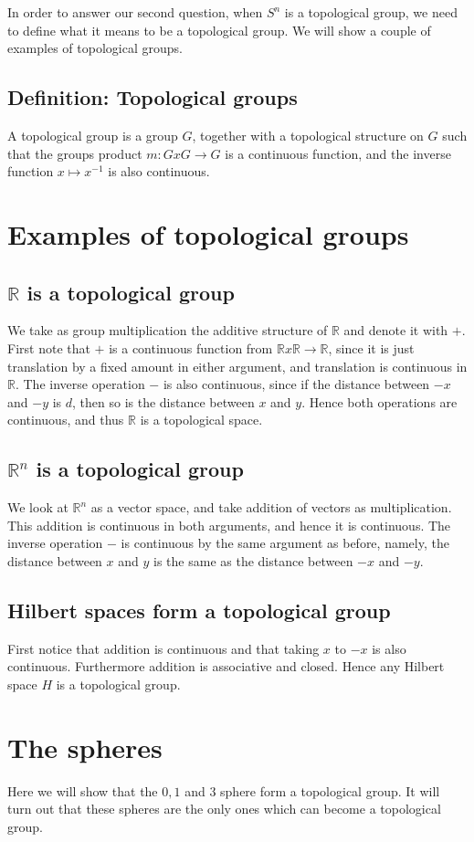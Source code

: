 \documentclass[../Thesis.tex]{subfiles}
\begin{document}
In order to answer our second question, when $S^{n}$ is a topological group, we need to define what it means to be a topological group. We will show a couple of examples of topological groups.
\subsection*{Definition: Topological groups}
A topological group is a group $G$, together with a topological structure on $G$ such that the groups product $m: G x G \rightarrow G$ is a continuous function, and the inverse function $x \mapsto x^{-1}$ is also continuous.
\section{Examples of topological groups}
\subsection{$\mathbb{R}$ is a topological group}
We take as group multiplication the additive structure of $\mathbb{R}$ and denote it with $+$. First note that $+$ is a continuous function from $\mathbb{R} x \mathbb{R} \rightarrow \mathbb{R}$, since it is just translation by a fixed amount in either argument, and translation is continuous in $\mathbb{R}$. The inverse operation $-$ is also continuous, since if the distance between $-x$ and $-y$ is $d$, then so is the distance between $x$ and $y$. Hence both operations are continuous, and thus $\mathbb{R}$ is a topological space.
\subsection{$\mathbb{R}^n$ is a topological group}
We look at $\mathbb{R}^n$ as a vector space, and take addition of vectors as multiplication. This addition is continuous in both arguments, and hence it is continuous. The inverse operation $-$ is continuous by the same argument as before, namely, the distance between $x$ and $y$ is the same as the distance between $-x$ and $-y$.
\subsection{Hilbert spaces form a topological group}
First notice that addition is continuous and that taking $x$ to $-x$ is also continuous. Furthermore addition is associative and closed. Hence any Hilbert space $H$ is a topological group.
\section{The spheres}
Here we will show that the $0, 1$ and $3$ sphere form a topological group. It will turn out that these spheres are the only ones which can become a topological group. 
\end{document}
